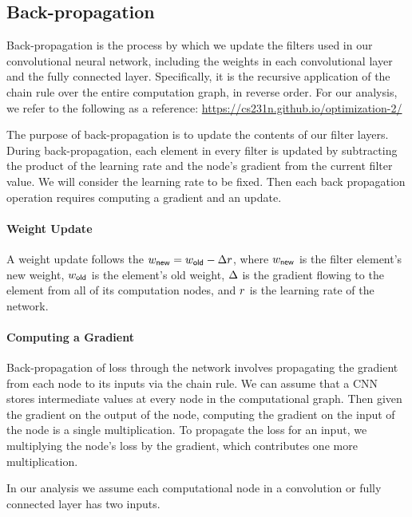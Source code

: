 \subsection{Back-propagation}
Back-propagation is the process by which we update the filters used in our convolutional neural network, including the weights in each convolutional layer  and the fully connected layer. Specifically, it is the recursive application of the chain rule over the entire computation graph, in reverse order. 
For our analysis, we refer to the following as a reference: \url{https://cs231n.github.io/optimization-2/}

The purpose of back-propagation is to update the contents of our filter layers.
During back-propagation, each element in every filter is updated by subtracting the product of the learning rate and the node's gradient from the current filter value. 
We will consider the learning rate to be fixed. Then each back propagation operation requires computing a gradient and an update. 

\paragraph{Weight Update}
A weight update follows the $w_{\mathsf{new}} = w_{\mathsf{old}} - \Delta r$, where $w_{\mathsf{new}}$ is the filter element's new weight, $w_{\mathsf{old}}$ is the element's old weight, $\Delta$ is the gradient flowing to the element from all of its computation nodes, and $r$ is the learning rate of the network.

\paragraph{Computing a Gradient}
Back-propagation of loss through the network involves propagating the gradient from each node to its inputs via the chain rule.
We can assume that a CNN stores intermediate values at every node in the computational graph. Then given the gradient on the output of the node, computing the gradient on the input of the node is a single multiplication. To propagate the loss for an input, we multiplying the node's loss by the gradient, which contributes one more multiplication.

In our analysis we assume each computational node in a convolution or fully connected layer has two inputs.




